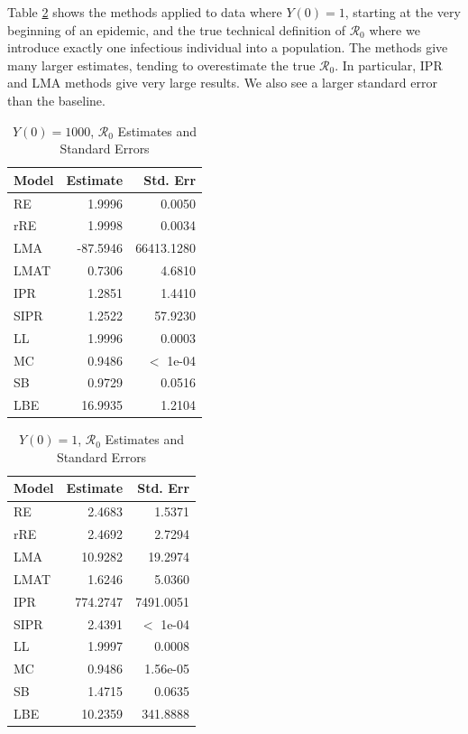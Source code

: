 \documentclass[12pt]{article}
\newcommand{\rr}{\ensuremath{\mathcal{R}_0}}
\begin{document}
Table \ref{tab:inits-res2} shows the methods applied to data where $Y(0) = 1$, starting at the very beginning of an epidemic, and the true technical definition of $\rr$ where we introduce exactly one infectious individual into a population. The methods give many larger estimates, tending to overestimate the true $\rr$. In particular, IPR and LMA methods give very large results. We also see a larger standard error than the baseline.



\begin{table}[H]
	
	\centering
	\begin{tabular}[t]{l|r|r}
		\hline
		Model & Estimate & Std. Err\\
		\hline
		RE & 1.9996 & 0.0050\\
		\hline
		rRE & 1.9998 & 0.0034\\
		\hline
		LMA & -87.5946 & 66413.1280\\
		\hline
		LMAT & 0.7306 & 4.6810\\
		\hline
		IPR & 1.2851 & 1.4410\\
		\hline
		SIPR & 1.2522 & 57.9230\\
		\hline
		LL & 1.9996 & 0.0003 \\
		\hline
		MC & 0.9486 & $<$ 1e-04\\
		\hline
		SB & 0.9729 & 0.0516\\
		\hline
		LBE & 16.9935 & 1.2104\\
		\hline
	\end{tabular}
        \caption{$Y(0) = 1000$, $\rr$ Estimates and Standard Errors}\label{tab:inits-res1}
\end{table}

\begin{table}[H]
	
	\centering
	\begin{tabular}[t]{l|r|r}
		\hline
		Model & Estimate & Std. Err\\
		\hline
		RE & 2.4683 & 1.5371\\
		\hline
		rRE & 2.4692 & 2.7294 \\
		\hline
		LMA & 10.9282 & 19.2974 \\
		\hline
		LMAT & 1.6246 & 5.0360\\
		\hline
		IPR & 774.2747 & 7491.0051 \\
		\hline
		SIPR & 2.4391 & $<$ 1e-04 \\
		\hline
		LL & 1.9997 & 0.0008\\
		\hline
		MC & 0.9486 & 1.56e-05\\
		\hline
		SB & 1.4715 & 0.0635\\
		\hline
		LBE & 10.2359 & 341.8888\\
		\hline
	\end{tabular}
        \caption{$Y(0) = 1$, $\rr$ Estimates and Standard Errors}\label{tab:inits-res2}
\end{table}
\end{document}
